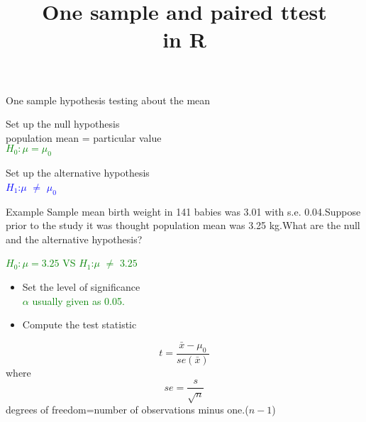 \documentclass[xcolor=dvipsnames]{beamer}
\begin{document}


\title{\textbf{One sample and paired ttest  \\
in R}}

\titlepage{}

\begin{frame}{One sample hypothesis testing about the mean}


\begin{enumerate}
\begin{pause}
\item Set up the null hypothesis \\
 \hspace{7mm}population mean = particular value  \\
  \hspace{7 mm}\textcolor{green}{$H_0: \mu=\mu_0$}
\end{pause}
\begin{pause}
 \item Set up the alternative hypothesis \\
  \hspace{7mm}\textcolor{blue}{$H_1$:$\mu$ $\neq$ $\mu_0$}
\end{pause}
 \end{enumerate}


\end{frame}

\begin{frame}{Example}
Sample mean birth weight in 141 babies was 3.01 with s.e. 0.04.Suppose prior to the study it was thought population mean was 3.25 kg.What are the null and the alternative hypothesis?\vspace{7 mm}

\begin{pause}
\hspace{7 mm}\textcolor{green}{$H_0: \mu=3.25$ VS
$H_1$:$\mu$ $\neq$ $3.25$}
\end{pause}
\end{frame}

\begin{frame}{}
\begin{itemize}
\item Set the level of significance \\
\hspace{7 mm} \textcolor{green}{$\alpha$ usually given as 0.05.}
\item Compute the test statistic
\end{itemize}

\begin{equation*}
t=\frac{\bar{x}-\mu_0}{se(\bar{x})}
\end{equation*}
where
\begin{equation*}
se=\frac{s}{\sqrt{n}}
\end{equation*}
degrees of freedom=number of observations minus one.($n-1$)
\end{frame}
\end{document}
